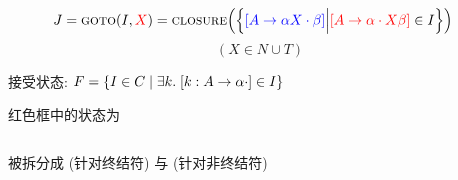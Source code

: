 \begin{frame}{}
\end{frame}

\begin{frame}{}
  \begin{center}

    \begin{align*}
      J = \textsc{goto}(I, \textcolor{red}{X}) &= \textsc{closure}\Big(\Big\{
            \textcolor{blue}{[A \to \alpha X \cdot \beta]}
          \Big\lvert \textcolor{red}{[A \to \alpha \cdot X \beta]} \in I \Big\}\Big)
    \end{align*}
    \[
      (X \in N \cup T)
    \]
  \end{center}
\end{frame}

\begin{frame}{}

  \pause
  \vspace{0.50cm}
  \begin{center}
    接受状态: $F = \{I \in C \mid \exists k.\; [k: A \to \alpha \cdot] \in I\}$
  \end{center}
\end{frame}

\begin{frame}{}
  \begin{center}

    红色框中的状态为 
  \end{center}
\end{frame}

\begin{frame}{}
  \begin{center}

    \begin{columns}
        
    \end{columns}

    \vspace{0.20cm}
    被拆分成  {\small (针对终结符)}
    与  {\small (针对非终结符)}
  \end{center}
\end{frame}

